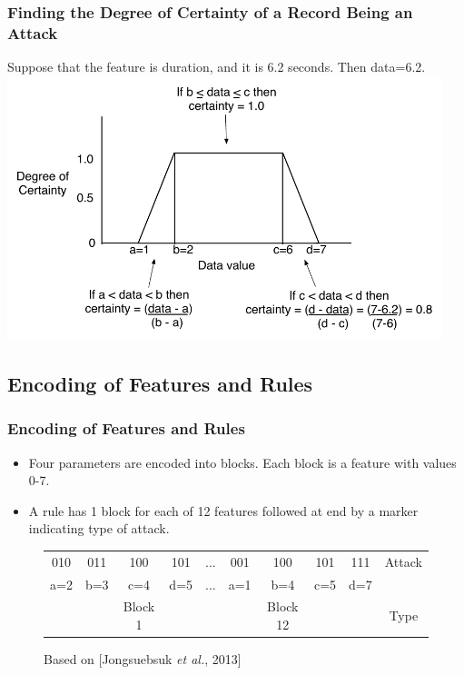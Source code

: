 \documentclass{beamer}
\begin{document}
\begin{frame}
  \frametitle{Finding the Degree of Certainty of a Record Being an Attack}
	Suppose that the feature is duration, and it is 6.2 seconds. Then data=6.2.
  \includegraphics[width=0.95\textwidth]{../trapFigExample.pdf}
\end{frame}


\subsection{Encoding of Features and Rules}
\begin{frame}
	\frametitle{Encoding of Features and Rules}
	\begin{itemize}
	\item Four parameters are encoded into blocks. Each block is a feature with values 0-7.
	\item A rule has 1 block for each of 12 features followed at end by a marker indicating type of attack.
	\end{itemize}

\begin{figure}
\begin{small}
\begin{tabular}{|cccc|c|cccc|c|} \hline
010 & 011 & 100 & 101   & ... & 001 & 100 & 101 & 111   & Attack\\
a=2 & b=3 & c=4 & d=5   & ... & a=1 & b=4 & c=5 & d=7   &\\  
    &     & Block 1&    &        &     & Block 12& &       & Type\\
\hline\end{tabular}
\caption{Based on [Jongsuebsuk \emph{et al.}, 2013]}
\end{small}
\end{figure}
\end{frame}
\end{document}
